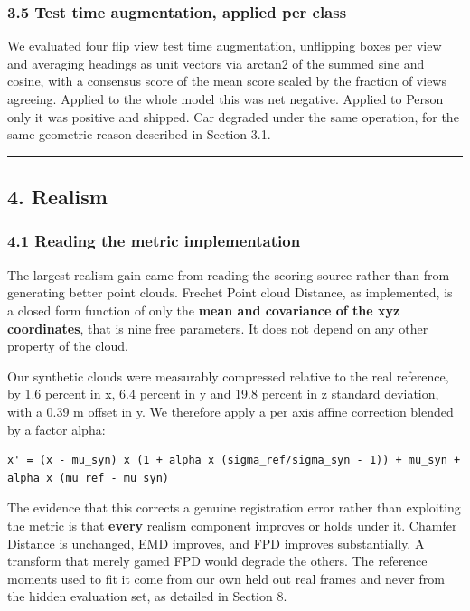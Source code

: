 \documentclass[
  10pt,
]{article}
\begin{document}
\subsubsection{3.5 Test time augmentation, applied per
class}\label{test-time-augmentation-applied-per-class}

We evaluated four flip view test time augmentation, unflipping boxes per
view and averaging headings as unit vectors via arctan2 of the summed
sine and cosine, with a consensus score of the mean score scaled by the
fraction of views agreeing. Applied to the whole model this was net
negative. Applied to Person only it was positive and shipped. Car
degraded under the same operation, for the same geometric reason
described in Section 3.1.

\begin{center}\rule{0.5\linewidth}{0.5pt}\end{center}

\subsection{4. Realism}\label{realism}

\subsubsection{4.1 Reading the metric
implementation}\label{reading-the-metric-implementation}

The largest realism gain came from reading the scoring source rather
than from generating better point clouds. Frechet Point cloud Distance,
as implemented, is a closed form function of only the \textbf{mean and
covariance of the xyz coordinates}, that is nine free parameters. It
does not depend on any other property of the cloud.

Our synthetic clouds were measurably compressed relative to the real
reference, by 1.6 percent in x, 6.4 percent in y and 19.8 percent in z
standard deviation, with a 0.39 m offset in y. We therefore apply a per
axis affine correction blended by a factor alpha:

\begin{verbatim}
x' = (x - mu_syn) x (1 + alpha x (sigma_ref/sigma_syn - 1)) + mu_syn + alpha x (mu_ref - mu_syn)
\end{verbatim}

The evidence that this corrects a genuine registration error rather than
exploiting the metric is that \textbf{every} realism component improves
or holds under it. Chamfer Distance is unchanged, EMD improves, and FPD
improves substantially. A transform that merely gamed FPD would degrade
the others. The reference moments used to fit it come from our own held
out real frames and never from the hidden evaluation set, as detailed in
Section 8.
\end{document}
